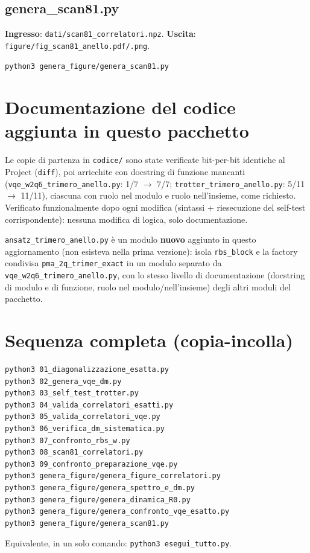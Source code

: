 \documentclass[11pt,a4paper]{article}
\begin{document}
\subsection{genera\_scan81.py}
\textbf{Ingresso}: \texttt{dati/scan81\_correlatori.npz}.
\textbf{Uscita}: \texttt{figure/fig\_scan81\_anello.pdf/.png}.
\begin{verbatim}
python3 genera_figure/genera_scan81.py
\end{verbatim}

\section{Documentazione del codice aggiunta in questo pacchetto}

Le copie di partenza in \texttt{codice/} sono state verificate
bit-per-bit identiche al Project (\texttt{diff}), poi arricchite con
docstring di funzione mancanti (\texttt{vqe\_w2q6\_trimero\_anello.py}:
1/7 $\to$ 7/7; \texttt{trotter\_trimero\_anello.py}: 5/11 $\to$ 11/11),
ciascuna con ruolo nel modulo e ruolo nell'insieme, come richiesto.
Verificato funzionalmente dopo ogni modifica (sintassi + riesecuzione
del self-test corrispondente): nessuna modifica di logica, solo
documentazione.

\texttt{ansatz\_trimero\_anello.py} è un modulo \textbf{nuovo} aggiunto
in questo aggiornamento (non esisteva nella prima versione): isola
\texttt{rbs\_block} e la factory condivisa \texttt{pma\_2q\_trimer\_exact}
in un modulo separato da \texttt{vqe\_w2q6\_trimero\_anello.py}, con lo
stesso livello di documentazione (docstring di modulo e di funzione,
ruolo nel modulo/nell'insieme) degli altri moduli del pacchetto.

\section{Sequenza completa (copia-incolla)}

\begin{verbatim}
python3 01_diagonalizzazione_esatta.py
python3 02_genera_vqe_dm.py
python3 03_self_test_trotter.py
python3 04_valida_correlatori_esatti.py
python3 05_valida_correlatori_vqe.py
python3 06_verifica_dm_sistematica.py
python3 07_confronto_rbs_w.py
python3 08_scan81_correlatori.py
python3 09_confronto_preparazione_vqe.py
python3 genera_figure/genera_figure_correlatori.py
python3 genera_figure/genera_spettro_e_dm.py
python3 genera_figure/genera_dinamica_R0.py
python3 genera_figure/genera_confronto_vqe_esatto.py
python3 genera_figure/genera_scan81.py
\end{verbatim}
Equivalente, in un solo comando: \texttt{python3 esegui\_tutto.py}.
\end{document}
